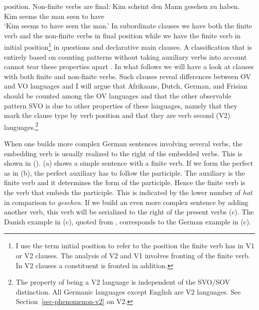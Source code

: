 position. Non-finite verbs are final: 
\ea
\gll Kim scheint den Mann gesehen zu haben.\\
     Kim seems   the man  seen to have\\
\glt `Kim seems to have seen the man.'
\z
In subordinate clauses we have both the finite verb and the non-finite verbs in final position while
we have the finite verb in initial position\footnote{%
  I use the term initial position to refer to the position the finite verb has in V1 or V2 clauses. The
  analysis of V2 and V1 involves fronting of the finite verb. In V2 clauses a constituent is fronted
  in addition.
} in questions and declarative main clauses.
A classification that is entirely based on counting patterns without taking auxiliary verbs into
account cannot tear these properties apart \citep{Hoehle83a}. In what follows we will have a look at clauses with
both finite and non-finite verbs. Such clauses reveal differences between OV and VO languages and I will argue that Afrikaans, Dutch,
German, and Frisian should be counted among the OV languages and that the other observable pattern
SVO is due to other properties of these languages, namely that they mark the clause type by verb
position and that they are verb second (V2) languages.\footnote{%
  The property of being a V2 language is independent of the SVO/SOV distinction. All Germanic
  languages except English are V2 languages. See Section~\ref{sec-phenomenon-v2} on V2.
}

When one builds more complex German sentences involving several verbs, the embedding verb is usually
realized to the right of the embedded verbs. This is shown in (). (a) shows a simple
sentence with a finite verb. If we form the perfect as in (b), the perfect auxiliary has to
follow the participle. The auxiliary is the finite verb and it determines the form of the
participle. Hence the finite verb is the verb that embeds the participle. This is indicated by the
lower number of \emph{hat} in comparison to \emph{gesehen}. If we build an even more complex
sentence by adding another verb, this verb will be serialized to the right of the present verbs
(c).  The Danish example in (c), quoted from \citet{Oersnes2009b}, corresponds to the
German example in (c).

